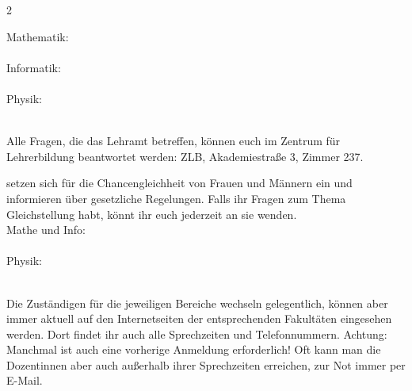 \begin{multicols}{2}
\begin{description}
    Mathematik: \bafogmathe\\
    \email{\bafogmatheemail} \\
    
    Informatik: \bafoginformatik\\
    \email{\bafoginformatikemail}\\
    
    Physik: \bafogphysik\\
    \email{\bafogphysikemail}\\

    \item[Lehramt] Alle Fragen, die das Lehramt betreffen, können euch im Zentrum für Lehrerbildung beantwortet werden: ZLB, Akademiestraße 3, Zimmer 237.\\

    \item[Gleichstellungskommissionen] setzen sich für die Chancengleichheit von Frauen und Männern ein und informieren über gesetzliche Regelungen. Falls ihr Fragen zum Thema Gleichstellung habt, könnt ihr euch jederzeit an sie wenden.\\
    
    Mathe und Info: \gleichstellungsbeauftragtemathe \\ \email{\gleichstellungsbeauftragtematheemail} \\
    
    Physik: \gleichstellungsbeauftragtephysik\\
    \email{\gleichstellungsbeauftragtephysikemail} \\
    
\end{description}

\noindent Die Zuständigen für die jeweiligen Bereiche wechseln gelegentlich, können aber immer aktuell auf den Internetseiten der entsprechenden Fakultäten eingesehen werden. Dort findet ihr auch alle Sprechzeiten und Telefonnummern. Achtung: Manchmal ist auch eine vorherige Anmeldung erforderlich! Oft kann man die Dozentinnen aber auch außerhalb ihrer Sprechzeiten erreichen, zur Not immer per E-Mail.\\

\relax


\end{multicols}
